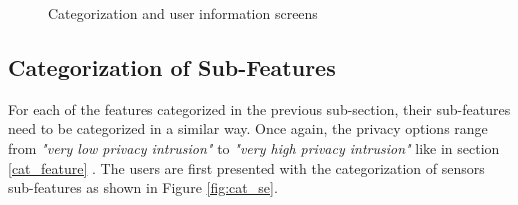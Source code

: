 \begin{figure}[htp]
  \hspace{1em}
  \caption{Categorization and user information screens}
  \label{fig:cat}
\end{figure}

\subsection{Categorization of Sub-Features}
For each of the features categorized in the previous sub-section, their sub-features need to be categorized in a similar way. Once again,
the privacy options range from \textit{"very low privacy intrusion"} to \textit{"very high privacy intrusion"} like in section \ref{cat_feature} . The users are first presented with
the categorization of sensors sub-features as shown in Figure \ref{fig:cat_se}. 

